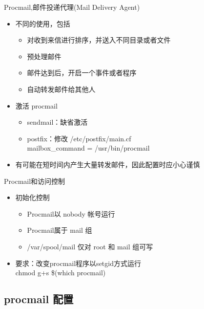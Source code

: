 \begin{frame}{Procmail,邮件投递代理(Mail Delivery Agent)}
\begin{itemize}
\item 不同的使用，包括

\begin{itemize}
\item 对收到来信进行排序，并送入不同目录或者文件
\item 预处理邮件
\item 邮件达到后，开启一个事件或者程序
\item 自动转发邮件给其他人
\end{itemize}
\item 激活 procmail

\begin{itemize}
\item sendmail：缺省激活
\item postfix：修改 /etc/postfix/main.cf\\
mailbox\_command = /usr/bin/procmail
\end{itemize}
\item 有可能在短时间内产生大量转发邮件，因此配置时应小心谨慎
\end{itemize}

\end{frame} 
\begin{frame}{Procmail和访问控制}
\begin{itemize}
\item 初始化控制

\begin{itemize}
\item Procmail以 nobody 帐号运行
\item Procmail属于 mail 组
\item /var/spool/mail 仅对 root 和 mail 组可写
\end{itemize}
\item 要求：改变procmail程序以setgid方式运行\\
chmod g+s \$(which procmail)
\end{itemize}

\end{frame} 
\subsection{procmail 配置}


